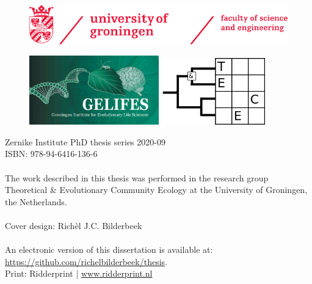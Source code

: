 \begin{titlepage}
%	

	
	
	
	
	\newpage \thispagestyle{empty}
	\vspace*{3.9cm}%
	
	
	\begin{figure}[!h]
		\includegraphics[width=\textwidth]{images/frontmatter/rugr_fse_logoen_rood_cmyk.pdf}
	\end{figure}
	
	\vfill
	\begin{figure}[!h]
		\includegraphics[width=0.5\textwidth]{images/frontmatter/gelifes_header_600x320.png}
		\includegraphics[width=0.4\textwidth]{images/frontmatter/tece_logo_2.png}
	\end{figure}
	\noindent
	{\small 
		Zernike Institute PhD thesis series 2020-09 \\
		ISBN:	978-94-6416-136-6 \\
		\\
		The work described in this thesis was performed in the research group 
    Theoretical \& Evolutionary Community Ecology at the University of Groningen, the Netherlands. \\
		\\
		Cover design: Rich\`el J.C. Bilderbeek \\
		\\
		An electronic version of this dissertation is available at: \\
	  \url{https://github.com/richelbilderbeek/thesis}. \\
		Print: Ridderprint | \url{www.ridderprint.nl} \\
		} 	
	
	
	\clearpage
	
	
	
\end{titlepage}
